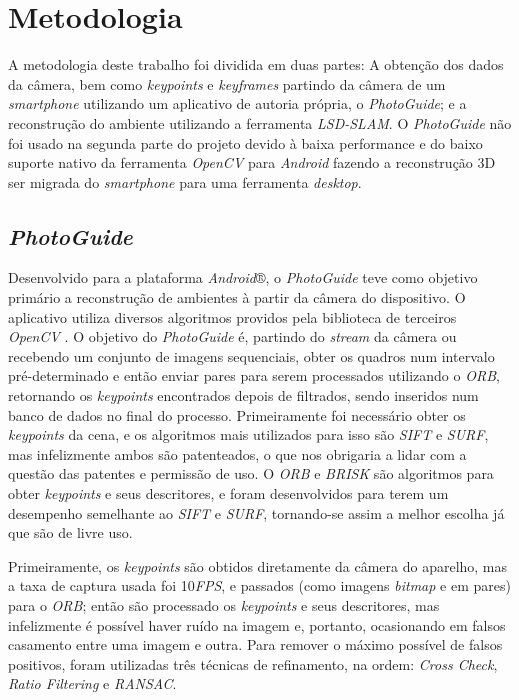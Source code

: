 \chapter{Metodologia}

A metodologia deste trabalho foi dividida em duas partes: A obtenção dos dados da câmera, bem como \textit{keypoints} e \textit{keyframes} partindo da câmera de um \textit{smartphone} utilizando um aplicativo de autoria própria, o \textit{PhotoGuide}; e a reconstrução do ambiente utilizando a ferramenta \textit{LSD-SLAM}. O \textit{PhotoGuide} não foi usado na segunda parte do projeto devido à baixa performance e do baixo suporte nativo da ferramenta \textit{OpenCV} para \textit{Android} fazendo a reconstrução 3D ser migrada do \textit{smartphone} para uma ferramenta \textit{desktop}.


\section{\textit{PhotoGuide}}

Desenvolvido para a plataforma \textit{Android}®, o \textit{PhotoGuide} \cite{PhotoGuide} teve como objetivo primário a reconstrução de ambientes à partir da câmera do dispositivo. O aplicativo utiliza diversos algoritmos providos pela biblioteca de terceiros \textit{OpenCV} \cite{OpenCV}. O objetivo do \textit{PhotoGuide} é, partindo do \textit{stream} da câmera ou recebendo um conjunto de imagens sequenciais, obter os quadros num intervalo pré-determinado e então enviar pares para serem processados utilizando o \textit{ORB}, retornando os \textit{keypoints} encontrados depois de filtrados, sendo inseridos num banco de dados no final do processo.  Primeiramente foi necessário obter os \textit{keypoints} da cena, e os algoritmos mais utilizados para isso são \textit{SIFT} e \textit{SURF}, mas infelizmente ambos são patenteados, o que nos obrigaria a lidar com a questão das patentes e permissão de uso. O \textit{ORB} e \textit{BRISK} são algoritmos para obter \textit{keypoints} e seus descritores, e foram desenvolvidos para terem um desempenho semelhante ao \textit{SIFT} e\textit{ SURF}, tornando-se assim a melhor escolha já que são de livre uso.

Primeiramente, os \textit{keypoints} são obtidos diretamente da câmera do aparelho, mas a taxa de captura usada foi 10\textit{FPS}, e passados (como imagens \textit{bitmap} e em pares) para o \textit{ORB}; então são processado os \textit{keypoints} e seus descritores, mas infelizmente é possível haver ruído na imagem e, portanto, ocasionando em falsos casamento entre uma imagem e outra. Para remover o máximo possível de falsos positivos, foram utilizadas três técnicas de refinamento, na ordem: \textit{Cross Check}, \textit{Ratio Filtering} e \textit{RANSAC}.


